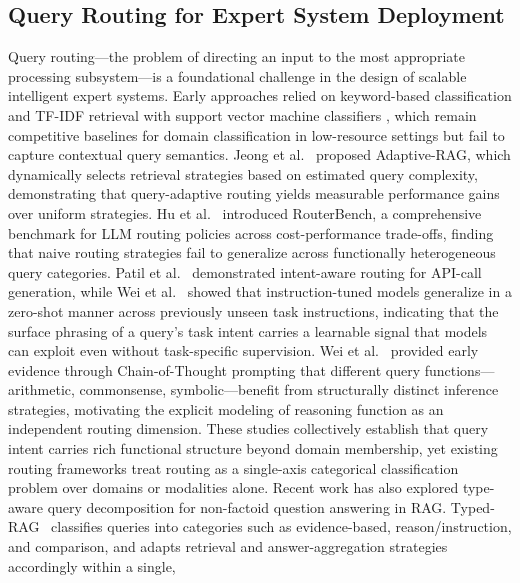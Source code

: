 \documentclass[a4paper,fleql]{cas-sc}
\begin{document}
\subsection{Query Routing for Expert System Deployment}
Query routing---the problem of directing an input to the most appropriate
processing subsystem---is a foundational challenge in the design of scalable
intelligent expert systems. Early approaches relied on keyword-based
classification and TF-IDF retrieval \citep{robertson2009tfidf} with support
vector machine classifiers \citep{cortes1995svm}, which remain competitive
baselines for domain classification in low-resource settings but fail to
capture contextual query semantics.
Jeong et al.\ \citep{jeong2024adaptiverag} proposed Adaptive-RAG, which
dynamically selects retrieval strategies based on estimated query complexity,
demonstrating that query-adaptive routing yields measurable performance gains
over uniform strategies. Hu et al.\ \citep{hu2024routerbench} introduced
RouterBench, a comprehensive benchmark for LLM routing policies across
cost-performance trade-offs, finding that naive routing strategies fail to
generalize across functionally heterogeneous query categories.
Patil et al.\ \citep{patil2023gorilla} demonstrated intent-aware routing for
API-call generation, while Wei et al.\ \citep{wei2022finetuned} showed that
instruction-tuned models generalize in a zero-shot manner across previously
unseen task instructions, indicating that the surface phrasing of a query's
task intent carries a learnable signal that models can exploit even without
task-specific supervision.
Wei et al.\ \citep{wei2022chain} provided early evidence through
Chain-of-Thought prompting that different query functions---arithmetic,
commonsense, symbolic---benefit from structurally distinct inference strategies,
motivating the explicit modeling of reasoning function as an independent routing
dimension. These studies collectively establish that query intent carries rich
functional structure beyond domain membership, yet existing routing frameworks
treat routing as a single-axis categorical classification problem over domains
or modalities alone.
Recent work has also explored type-aware query decomposition for non-factoid
question answering in RAG. Typed-RAG~\citep{typedrag} classifies queries into
categories such as evidence-based, reason/instruction, and comparison, and
adapts retrieval and answer-aggregation strategies accordingly within a single,
\end{document}

